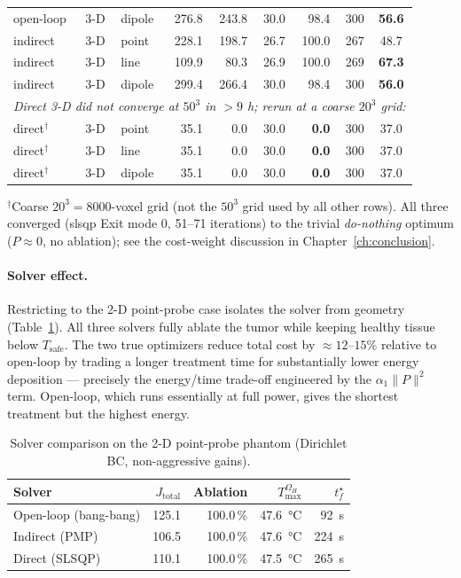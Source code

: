\begin{table}[htbp]
\begin{tabular}{lll rrr rr c}
open-loop & 3-D & dipole & 276.8 & 243.8 & 30.0 &  98.4 & 300 & \textbf{56.6} \\
indirect  & 3-D & point  & 228.1 & 198.7 & 26.7 & 100.0 & 267 & 48.7 \\
indirect  & 3-D & line   & 109.9 &  80.3 & 26.9 & 100.0 & 269 & \textbf{67.3} \\
indirect  & 3-D & dipole & 299.4 & 266.4 & 30.0 &  98.4 & 300 & \textbf{56.0} \\
\midrule
\multicolumn{9}{l}{\textit{Direct 3-D did not converge at $50^3$ in $>9$ h; rerun at a coarse $20^3$ grid:}} \\
direct$^\dagger$ & 3-D & point  & 35.1 & 0.0 & 30.0 & \textbf{0.0} & 300 & 37.0 \\
direct$^\dagger$ & 3-D & line   & 35.1 & 0.0 & 30.0 & \textbf{0.0} & 300 & 37.0 \\
direct$^\dagger$ & 3-D & dipole & 35.1 & 0.0 & 30.0 & \textbf{0.0} & 300 & 37.0 \\
\bottomrule
\end{tabular}

\vspace{2pt}
\footnotesize $^\dagger$Coarse $20^3 = 8000$-voxel grid (not the $50^3$ grid
used by all other rows). All three converged (\gls{slsqp} Exit mode 0,
51--71 iterations) to the trivial \emph{do-nothing} optimum
($P \approx 0$, no ablation); see the cost-weight discussion in
Chapter~\ref{ch:conclusion}.
\end{table}

\paragraph{Solver effect.}
Restricting to the 2-D point-probe case isolates the solver from geometry
(Table~\ref{tab:solver-comparison}). All three solvers fully ablate the
tumor while keeping healthy tissue below $T_{\text{safe}}$. The two true
optimizers reduce total cost by $\approx 12$--$15\%$ relative to open-loop
by trading a longer treatment time for substantially lower energy
deposition --- precisely the energy/time trade-off engineered by the
$\alpha_1\|P\|^2$ term. Open-loop, which runs essentially at full power,
gives the shortest treatment but the highest energy.

\begin{table}[htbp]
\centering
\caption{Solver comparison on the 2-D point-probe phantom
         (Dirichlet BC, non-aggressive gains).}
\label{tab:solver-comparison}
\renewcommand{\arraystretch}{1.4}
\begin{tabular}{lrrrr}
\toprule
Solver & $J_{\text{total}}$ & Ablation & $T_{\max}^{\Omega_H}$ & $t_f^\star$ \\
\midrule
Open-loop (bang-bang) & 125.1 & 100.0\,\% & \SI{47.6}{\degreeCelsius} & \SI{92}{\second} \\
Indirect (PMP)        & 106.5 & 100.0\,\% & \SI{47.6}{\degreeCelsius} & \SI{224}{\second} \\
Direct (SLSQP)        & 110.1 & 100.0\,\% & \SI{47.5}{\degreeCelsius} & \SI{265}{\second} \\
\bottomrule
\end{tabular}
\end{table}

